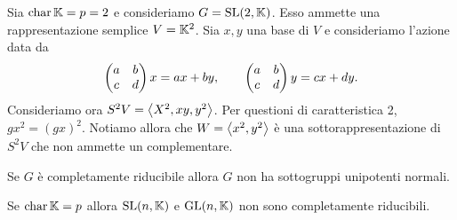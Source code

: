 \begin{example}
Sia $\operatorname{char} \mathbb{K}=p=2$ e consideriamo $G=\mathrm{SL}(2,\mathbb{K})$. Esso ammette una rappresentazione semplice $V=\mathbb{K}^2$. Sia $x,y$ una base di $V$ e consideriamo l'azione data da
\[\begin{pmatrix}a&b\\c&d\end{pmatrix}x=ax+by,\qquad \begin{pmatrix}a&b\\c&d\end{pmatrix}y=cx+dy.\]
Consideriamo ora $S^2V=\left\langle {X^2,xy,y^2}\right\rangle$. Per questioni di caratteristica 2, $gx^2=(gx)^2$. Notiamo allora che $W=\left\langle {x^2,y^2}\right\rangle$ \`e una sottorappresentazione di $S^2V$ che non ammette un complementare.
\end{example}

\begin{exercise}
Se $G$ \`e completamente riducibile allora $G$ non ha sottogruppi unipotenti normali.
\end{exercise}
\begin{exercise}
Se $\operatorname{char} \mathbb{K}=p$ allora $\mathrm{SL}(n,\mathbb{K})$ e $\mathrm{GL}(n,\mathbb{K})$ non sono completamente riducibili.
\end{exercise}